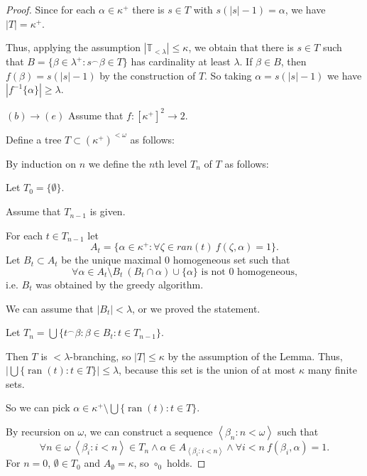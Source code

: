 \documentclass[a4paper,10pt,reqno]{amsart}
\numberwithin{equation}{section}
\theoremstyle{definition}
\theoremstyle{remark}
\newcommand{\mbb}[1]{\mathbb{#1}}
\newcommand{\setm}{\setminus}
\newcommand{\empt}{\emptyset}
\newcommand{\subs}{\subset}
\newcommand{\ran}{\operatorname{ran}}
\def\<{\left\langle}
\def\>{\right\rangle}
\begin{document}
\begin{proof}
Since for each ${\alpha}\in {\kappa}^+$ there is $s\in T$ with 
$s(|s|-1)={\alpha}$,
we have  $|T|={\kappa}^+$.  

Thus, applying the assumption $|\mbb T_{<{\lambda}}|\le {\kappa}$, we obtain that 
there is $s\in T$ such that $B=\{{\beta}\in {\lambda}^+: s^\frown{\beta}\in T \}$
has cardinality at least ${\lambda}$.
If ${\beta}\in B$, then $f({\beta})=s(|s|-1)$ by the construction of $T$.
So taking ${\alpha}=s(|s|-1)$ we have $|f^{-1}\{{\alpha}\}|\ge {\lambda}$.

\medskip

\noindent $(b)\to (e)$
Assume that $f:{[{{\kappa}^+}]}^{2}\to 2$.
    
Define a tree $ T\subs {({{\kappa}^+})}^{<{\omega}}$ as follows:  

By induction on $n$ we define the $n$th level $T_n$ of $T$ as follows:




Let $T_0=\{\empt\}$. 

Assume that $T_{n-1}$  is given. 

For each  $t\in T_{n-1}$ let 
$$A_t=\{{\alpha}\in {{\kappa}^+}: \forall {\zeta}\in ran(t)\  f({\zeta},{\alpha})=1\}.$$
Let $B_t\subs A_t$ be the unique maximal 0 homogeneous set such that 
\begin{displaymath}\tag{$\dag$}\label{dag}
\forall {\alpha}\in  A_t\setm B_t\ (B_t\cap {\alpha})\cup\{{\alpha}\} \text{ is not 
0 homogeneous,}
\end{displaymath}
i.e. $B_t$ was obtained by the  greedy algorithm.

 We can assume that $|B_t|<{\lambda}$, or we proved the statement.

Let $T_{n}=\bigcup \{t^\frown {\beta}:{\beta}\in B_t:t\in T_{n-1}\}$. 


Then $T$ is $<{\lambda}$-branching, so $|T|\le {\kappa}$ by the assumption of the Lemma. 
Thus, $|\bigcup\{\ran(t):t\in T\}|\le {\lambda}$, because this set is the union of at most ${\kappa}$ many 
finite sets.

So we can pick      ${\alpha}\in {\kappa}^+\setm \bigcup\{\ran(t):t\in T\}$.

By recursion on ${\omega}$, we can construct a sequence
$\<{\beta}_n:n<{\omega}\>$ such that 
\begin{displaymath}\tag{$\circ_n$}
\forall n\in {\omega}\ \<{\beta}_i:i<n\>\in T_n \land {\alpha}\in A_{\<{\beta}_i:i<n\>}
\land\forall i<n\  f({\beta}_i,{\alpha})=1.
\end{displaymath}
For $n=0$,  $\empt\in T_0$ and   $A_{\empt}={\kappa}$,  so $\circ_0$ holds. 


\end{proof}
\end{document}
